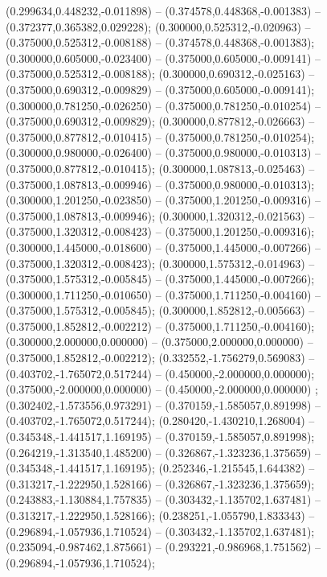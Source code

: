  (0.299634,0.448232,-0.011898) -- (0.374578,0.448368,-0.001383) -- (0.372377,0.365382,0.029228);
 (0.300000,0.525312,-0.020963) -- (0.375000,0.525312,-0.008188) -- (0.374578,0.448368,-0.001383);
 (0.300000,0.605000,-0.023400) -- (0.375000,0.605000,-0.009141) -- (0.375000,0.525312,-0.008188);
 (0.300000,0.690312,-0.025163) -- (0.375000,0.690312,-0.009829) -- (0.375000,0.605000,-0.009141);
 (0.300000,0.781250,-0.026250) -- (0.375000,0.781250,-0.010254) -- (0.375000,0.690312,-0.009829);
 (0.300000,0.877812,-0.026663) -- (0.375000,0.877812,-0.010415) -- (0.375000,0.781250,-0.010254);
 (0.300000,0.980000,-0.026400) -- (0.375000,0.980000,-0.010313) -- (0.375000,0.877812,-0.010415);
 (0.300000,1.087813,-0.025463) -- (0.375000,1.087813,-0.009946) -- (0.375000,0.980000,-0.010313);
 (0.300000,1.201250,-0.023850) -- (0.375000,1.201250,-0.009316) -- (0.375000,1.087813,-0.009946);
 (0.300000,1.320312,-0.021563) -- (0.375000,1.320312,-0.008423) -- (0.375000,1.201250,-0.009316);
 (0.300000,1.445000,-0.018600) -- (0.375000,1.445000,-0.007266) -- (0.375000,1.320312,-0.008423);
 (0.300000,1.575312,-0.014963) -- (0.375000,1.575312,-0.005845) -- (0.375000,1.445000,-0.007266);
 (0.300000,1.711250,-0.010650) -- (0.375000,1.711250,-0.004160) -- (0.375000,1.575312,-0.005845);
 (0.300000,1.852812,-0.005663) -- (0.375000,1.852812,-0.002212) -- (0.375000,1.711250,-0.004160);
 (0.300000,2.000000,0.000000) -- (0.375000,2.000000,0.000000) -- (0.375000,1.852812,-0.002212);
 (0.332552,-1.756279,0.569083) -- (0.403702,-1.765072,0.517244) -- (0.450000,-2.000000,0.000000);
 (0.375000,-2.000000,0.000000) -- (0.450000,-2.000000,0.000000) ;
 (0.302402,-1.573556,0.973291) -- (0.370159,-1.585057,0.891998) -- (0.403702,-1.765072,0.517244);
 (0.280420,-1.430210,1.268004) -- (0.345348,-1.441517,1.169195) -- (0.370159,-1.585057,0.891998);
 (0.264219,-1.313540,1.485200) -- (0.326867,-1.323236,1.375659) -- (0.345348,-1.441517,1.169195);
 (0.252346,-1.215545,1.644382) -- (0.313217,-1.222950,1.528166) -- (0.326867,-1.323236,1.375659);
 (0.243883,-1.130884,1.757835) -- (0.303432,-1.135702,1.637481) -- (0.313217,-1.222950,1.528166);
 (0.238251,-1.055790,1.833343) -- (0.296894,-1.057936,1.710524) -- (0.303432,-1.135702,1.637481);
 (0.235094,-0.987462,1.875661) -- (0.293221,-0.986968,1.751562) -- (0.296894,-1.057936,1.710524);
